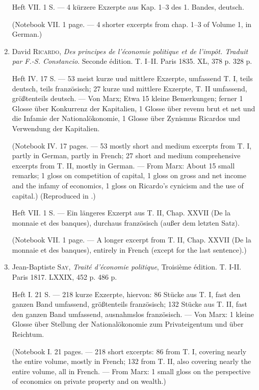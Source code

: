 \begin{enumerate}
    Heft VII. 1 S. --- 4 kürzere Exzerpte aus Kap. 1--3 des 1. Bandes, deutsch.
    
    (Notebook VII. 1 page. --- 4 shorter excerpts from chap. 1--3 of Volume 1, in German.)
    
    \item David \textsc{Ricardo}, \textit{Des principes de l'économie politique et de l'impôt. Traduit par F.-S. Constancio}. Seconde édition. T. I--II. Paris 1835. XL, 378 p. 328 p.
    
    Heft IV. 17 S. --- 53 meist kurze uud mittlere Exzerpte, umfassend T. I, teils deutsch, teils französisch; 27 kurze und mittlere Exzerpte, T. II umfassend, größtenteils deutsch. --- Von Marx; Etwa 15 kleine Bemerkungen; ferner 1 Glosse über Konkurrenz der Kapitalien, 1 Glosse über revenu brut et net und die Infamie der Nationalökonomie, 1 Glosse über Zynismus Ricardos und Verwendung der Kapitalien.
    
    (Notebook IV. 17 pages. --- 53 mostly short and medium excerpts from T. I, partly in German, partly in French; 27 short and medium comprehensive excerpts from T. II, mostly in German. --- From Marx: About 15 small remarks; 1 gloss on competition of capital, 1 gloss on gross and net income and the infamy of economics, 1 gloss on Ricardo's cynicism and the use of capital.) 
    (Reproduced in .)
    
    Heft VII. 1 S. --- Ein längeres Exzerpt aus T. II, Chap. XXVII (De la monnaie et des banques), durchaus französisch (außer dem letzten Satz).
    
    (Notebook VII. 1 page. --- A longer excerpt from T. II, Chap. XXVII (De la monnaie et des banques), entirely in French (except for the last sentence).)
    
    \item Jean-Baptiste \textsc{Say}, \textit{Traité d'économie politique}, Troisième édition. T. I-II. Paris 1817. LXXIX, 452 p. 486 p.
    
    Heft I. 21 S. --- 218 kurze Exzerpte, hiervon: 86 Stücke aus T. I, fast den ganzen Band umfassend, größtenteils französisch; 132 Stücke aus T. II, fast den ganzen Band umfassend, ausnahmslos französisch. --- Von Marx: 1 kleine Glosse über Stellung der Nationalökonomie zum Privateigentum und über Reichtum.
    
    (Notebook I. 21 pages. --- 218 short excerpts: 86 from T. I, covering nearly the entire volume, mostly in French; 132 from T. II, also covering nearly the entire volume, all in French. --- From Marx: 1 small gloss on the perspective of economics on private property and on wealth.)
    

\end{enumerate}

